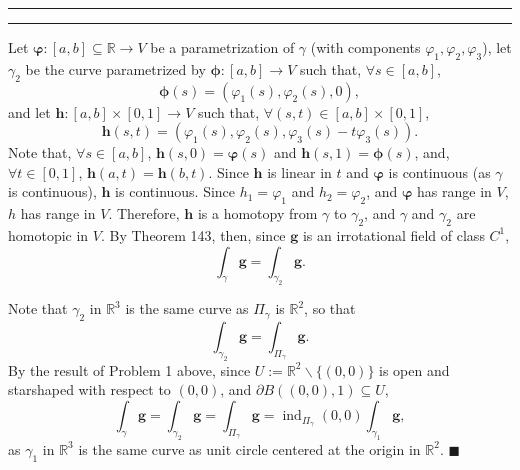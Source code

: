 \documentclass[11pt]{article}
\newcounter{questionCounter}
\newcounter{partCounter}[questionCounter]
\newenvironment{question}[2][\arabic{questionCounter}]{%
    \setcounter{partCounter}{0}%
    \vspace{.25in} \hrule \vspace{0.5em}%
        \noindent{\bf #2}%
    \vspace{0.8em} \hrule \vspace{.10in}%
    \addtocounter{questionCounter}{1}%
}{}
\begin{document}
\begin{question}{Problem 2}
Let $\boldsymbol{\varphi}: [a,b] \subseteq \mathbb{R} \rightarrow V$
be a parametrization of $\gamma$ (with components
$\varphi_1,\varphi_2,\varphi_3$), let $\gamma_2$ be the curve parametrized by
$\boldsymbol{\phi}: [a,b] \rightarrow V$ such that,
$\forall s \in [a,b]$,
\[\boldsymbol{\phi}(s) = (\varphi_1(s),\varphi_2(s),0),\] and let
$\mathbf{h}:[a,b] \times [0,1] \rightarrow V$ such that,
$\forall (s,t) \in [a,b] \times [0,1]$,
\[\mathbf{h}(s,t) = (\varphi_1(s),\varphi_2(s),\varphi_3(s) - t\varphi_3(s)).\]
Note that, $\forall s \in [a,b]$, $\mathbf{h}(s,0) = \boldsymbol{\varphi}(s)$ and
$\mathbf{h}(s,1) = \boldsymbol{\phi}(s)$, and, $\forall t \in [0,1]$,
$\mathbf{h}(a,t) = \mathbf{h}(b,t)$. Since $\mathbf{h}$ is linear in $t$ and
$\boldsymbol{\varphi}$ is continuous (as $\gamma$ is continuous), $\mathbf{h}$
is continuous. Since $h_1 = \varphi_1$ and $h_2 = \varphi_2$, and
$\boldsymbol{\varphi}$ has range in $V$, $h$ has range in $V$. Therefore,
$\mathbf{h}$ is a homotopy from $\gamma$ to $\gamma_2$, and $\gamma$ and
$\gamma_2$ are homotopic in $V$. By Theorem 143, then, since $\mathbf{g}$ is
an irrotational field of class $C^1$,
\[\int_{\gamma} \mathbf{g} = \int_{\gamma_2} \mathbf{g}.\]

Note that $\gamma_2$ in $\mathbb{R}^3$ is the same curve as $\Pi_{\gamma}$ is
$\mathbb{R}^2$, so that
\[\int_{\gamma_2} \mathbf{g} = \int_{\Pi_{\gamma}} \mathbf{g}.\] By the result
of Problem 1 above, since $U := \mathbb{R}^2 \backslash \{(0,0)\}$ is open and
starshaped with respect to $(0,0)$, and $\partial B((0,0),1) \subseteq U$,
\[\int_{\gamma} \mathbf{g}
 = \int_{\gamma_2} \mathbf{g}
 = \int_{\Pi_{\gamma}} \mathbf{g}
 = \operatorname{ind}_{\Pi_{\gamma}}(0,0) \int_{\gamma_1} \mathbf{g},
\]
as $\gamma_1$ in $\mathbb{R}^3$ is the same curve as unit circle centered at
the origin in $\mathbb{R}^2$. \quad $\blacksquare$
\end{question}
\end{document}
